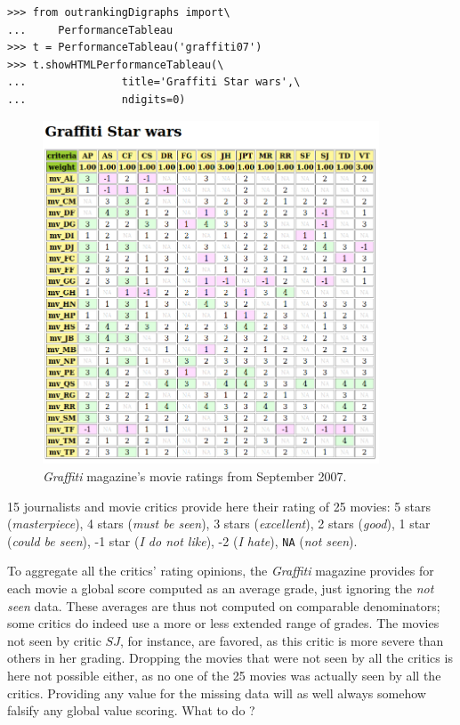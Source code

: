 \begin{lstlisting}
>>> from outrankingDigraphs import\
...     PerformanceTableau 
>>> t = PerformanceTableau('graffiti07')
>>> t.showHTMLPerformanceTableau(\
...               title='Graffiti Star wars',\
...               ndigits=0)
\end{lstlisting}
\begin{figure}[h]
\includegraphics[width=10cm]{Figures/graffiti07_1.png}
\caption{\emph{Graffiti} magazine's movie ratings from September 2007.}
\label{fig:16.1}       %
\end{figure}

15 journalists and movie critics provide here their rating of 25 movies: 5 stars (\emph{masterpiece}), 4 stars (\emph{must be seen}), 3 stars (\emph{excellent}), 2 stars (\emph{good}), 1 star (\emph{could be seen}), -1 star (\emph{I do not like}), -2 (\emph{I hate}), \texttt{NA} (\emph{not seen}).

To aggregate all the critics' rating opinions, the \emph{Graffiti} magazine provides for each movie a global score computed as an average grade, just ignoring the \emph{not seen} data. These averages are thus not computed on comparable denominators; some critics do indeed use a more or less extended range of grades. The movies not seen by critic $SJ$, for instance, are favored, as this critic is more severe than others in her grading. Dropping the movies that were not seen by all the critics is here not possible either, as no one of the 25 movies was actually seen by all the critics. Providing any value for the missing data will as well always somehow falsify any global value scoring. What to do ?

